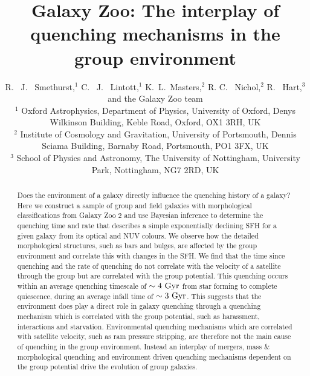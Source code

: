 \documentclass[useAMS,usenatbib]{mn2e}
\begin{document}
\title[Group environment quenching mechanisms]{Galaxy Zoo: The interplay of quenching mechanisms in the group environment}
\author[Smethurst et al. 2015]{R. ~J. ~Smethurst,$^{1}$ C. ~J. ~Lintott,$^{1}$ K.~L.~Masters,$^{2}$ R. C. ~Nichol,$^{2}$ \newauthor R. ~Hart,$^{3}$ and the Galaxy Zoo team \footnotemark[1]
\\ $^1$ Oxford Astrophysics, Department of Physics, University of Oxford, Denys Wilkinson Building, Keble Road, Oxford, OX1 3RH, UK 
\\ $^2$ Institute of Cosmology and Gravitation, University of Portsmouth, Dennis Sciama Building, Barnaby Road, Portsmouth, PO1 3FX, UK 
\\ $^3$ School of Physics and Astronomy, The University of Nottingham, University Park, Nottingham, NG7 2RD, UK
}

\maketitle

\begin{abstract}
Does the environment of a galaxy directly influence the quenching history of a galaxy? Here we construct a sample of group and field galaxies with morphological classifications from Galaxy Zoo 2 and use Bayesian inference to determine the quenching time and rate that describes a simple exponentially declining SFH for a given galaxy from its optical and NUV colours. We observe how the detailed morphological structures, such as bars and bulges, are affected by the group environment and correlate this with changes in the SFH. We find that the time since quenching and the rate of quenching do not correlate with the velocity of a satellite through the group but are correlated with the group potential. This quenching occurs within an average quenching timescale of $\sim4~\rm{Gyr}$ from star forming to complete quiescence, during an average infall time of $\sim 3 ~\rm{Gyr}$. This suggests that the environment does play a direct role in galaxy quenching through a quenching mechanism which is correlated with the group potential, such as harassment, interactions and starvation. Environmental quenching mechanisms which are correlated with satellite velocity, such as ram pressure stripping, are therefore not the main cause of quenching in the group environment. Instead an interplay of mergers, mass \& morphological quenching and environment driven quenching mechanisms dependent on the group potential drive the evolution of group galaxies. 

\end{abstract}
\end{document}
